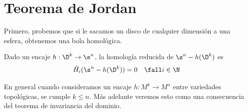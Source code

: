 \section{Teorema de Jordan}

Primero, probemos que si le sacamos un disco de cualquier dimensión a una esfera, obtenemos una bola homológica.

\begin{teo}
    Dado un encaje $h:\D^k\to \s^n$, la homología reducida de $\s^n - h(\D^k)$ es $$\tilde{H_i}(\s^n - h(\D^k))=0  \quad\fall i\in\N$$
\end{teo}
\begin{obs}
En general cuando consideramos un encaje $h:M^k\to M^n$ entre variedades topológicas, se cumple $k\leq n$. Más adelante veremos esto como una consecuencia del teorema de invariancia del dominio.
\end{obs}

